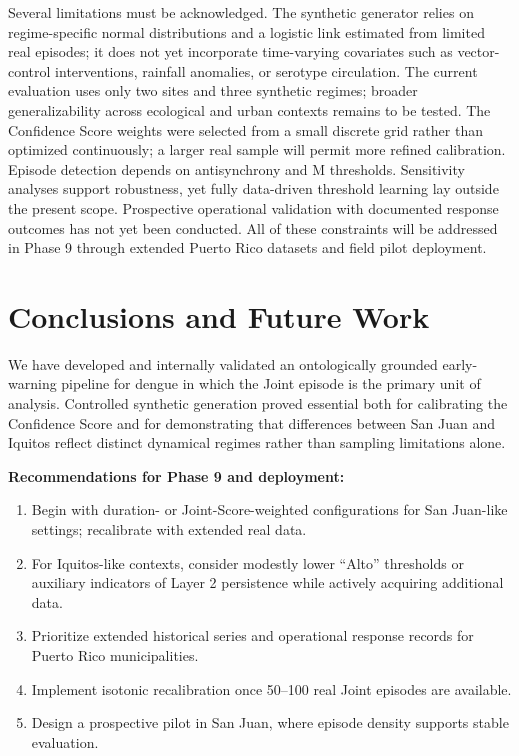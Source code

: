 \documentclass[11pt,a4paper]{article}
\begin{document}
Several limitations must be acknowledged. The synthetic generator relies on regime-specific normal distributions and a logistic link estimated from limited real episodes; it does not yet incorporate time-varying covariates such as vector-control interventions, rainfall anomalies, or serotype circulation. The current evaluation uses only two sites and three synthetic regimes; broader generalizability across ecological and urban contexts remains to be tested. The Confidence Score weights were selected from a small discrete grid rather than optimized continuously; a larger real sample will permit more refined calibration. Episode detection depends on antisynchrony and M thresholds. Sensitivity analyses support robustness, yet fully data-driven threshold learning lay outside the present scope. Prospective operational validation with documented response outcomes has not yet been conducted. All of these constraints will be addressed in Phase 9 through extended Puerto Rico datasets and field pilot deployment.

\section{Conclusions and Future Work}

We have developed and internally validated an ontologically grounded early-warning pipeline for dengue in which the Joint episode is the primary unit of analysis. Controlled synthetic generation proved essential both for calibrating the Confidence Score and for demonstrating that differences between San Juan and Iquitos reflect distinct dynamical regimes rather than sampling limitations alone.

\textbf{Recommendations for Phase 9 and deployment:}
\begin{enumerate}
    \item Begin with duration- or Joint-Score-weighted configurations for San Juan-like settings; recalibrate with extended real data.
    \item For Iquitos-like contexts, consider modestly lower “Alto” thresholds or auxiliary indicators of Layer 2 persistence while actively acquiring additional data.
    \item Prioritize extended historical series and operational response records for Puerto Rico municipalities.
    \item Implement isotonic recalibration once 50--100 real Joint episodes are available.
    \item Design a prospective pilot in San Juan, where episode density supports stable evaluation.
\end{enumerate}
\end{document}
